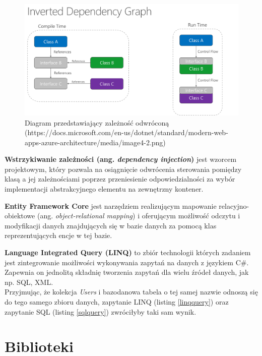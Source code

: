 	\begin{figure}[!ht]
		\begin{center}
			\includegraphics[width=6in]{img/diagram/inverted_dependency.png}
			\caption{Diagram przedstawiający zależność odwróconą (https://docs.microsoft.com/en-us/dotnet/standard/modern-web-apps-azure-architecture/media/image4-2.png)}
			\label{inverted_dependency}
		\end{center}
	\end{figure}
\textbf{Wstrzykiwanie zależności (ang. \textit{dependency injection})} jest wzorcem projektowym, który pozwala na osiągnięcie odwrócenia sterowania pomiędzy klasą a jej zależnościami poprzez przeniesienie odpowiedzialności za wybór implementacji abstrakcyjnego elementu na zewnętrzny kontener.\cite{dependencyinjection}

\textbf{Entity Framework Core} jest narzędziem realizującym mapowanie relacyjno-obiektowe (ang. \textit{object-relational mapping}) i oferującym możliwość odczytu i modyfikacji danych znajdujących się w bazie danych za pomocą klas reprezentujących encje w tej bazie.\cite{efcore}

\textbf{Language Integrated Query (LINQ)} to zbiór technologii których zadaniem jest zintegrowanie możliwości wykonywania zapytań na danych z językiem C\#. Zapewnia on jednolitą składnię tworzenia zapytań dla wielu źródeł danych, jak np. SQL, XML.\cite{linq}\\
Przyjmując, że kolekcja \textit{Users} i bazodanowa tabela o tej samej nazwie odnoszą się do tego samego zbioru danych, zapytanie LINQ (listing \ref{linqquery}) oraz zapytanie SQL (listing \ref{sqlquery}) zwróciłyby taki sam wynik.


\section{Biblioteki}

